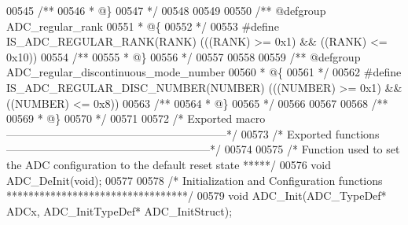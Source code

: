 \begin{DoxyCode}
00545 \textcolor{comment}{/**}
00546 \textcolor{comment}{  * @\}}
00547 \textcolor{comment}{  */}
00548 
00549 
00550 \textcolor{comment}{/** @defgroup ADC\_regular\_rank }
00551 \textcolor{comment}{  * @\{}
00552 \textcolor{comment}{  */}
00553 \textcolor{preprocessor}{#}\textcolor{preprocessor}{define} \textcolor{preprocessor}{IS\_ADC\_REGULAR\_RANK}\textcolor{preprocessor}{(}\textcolor{preprocessor}{RANK}\textcolor{preprocessor}{)} \textcolor{preprocessor}{(}\textcolor{preprocessor}{(}\textcolor{preprocessor}{(}\textcolor{preprocessor}{RANK}\textcolor{preprocessor}{)} \textcolor{preprocessor}{>=} 0x1\textcolor{preprocessor}{)} \textcolor{preprocessor}{&&} \textcolor{preprocessor}{(}\textcolor{preprocessor}{(}\textcolor{preprocessor}{RANK}\textcolor{preprocessor}{)} \textcolor{preprocessor}{<=} 0x10\textcolor{preprocessor}{)}\textcolor{preprocessor}{)}
00554 \textcolor{comment}{/**}
00555 \textcolor{comment}{  * @\}}
00556 \textcolor{comment}{  */}
00557 
00558 
00559 \textcolor{comment}{/** @defgroup ADC\_regular\_discontinuous\_mode\_number }
00560 \textcolor{comment}{  * @\{}
00561 \textcolor{comment}{  */}
00562 \textcolor{preprocessor}{#}\textcolor{preprocessor}{define} \textcolor{preprocessor}{IS\_ADC\_REGULAR\_DISC\_NUMBER}\textcolor{preprocessor}{(}\textcolor{preprocessor}{NUMBER}\textcolor{preprocessor}{)} \textcolor{preprocessor}{(}\textcolor{preprocessor}{(}\textcolor{preprocessor}{(}\textcolor{preprocessor}{NUMBER}\textcolor{preprocessor}{)} \textcolor{preprocessor}{>=} 0x1\textcolor{preprocessor}{)} \textcolor{preprocessor}{&&} \textcolor{preprocessor}{(}\textcolor{preprocessor}{(}\textcolor{preprocessor}{NUMBER}\textcolor{preprocessor}{)} \textcolor{preprocessor}{<=} 0x8\textcolor{preprocessor}{)}\textcolor{preprocessor}{)}
00563 \textcolor{comment}{/**}
00564 \textcolor{comment}{  * @\}}
00565 \textcolor{comment}{  */}
00566 
00567 
00568 \textcolor{comment}{/**}
00569 \textcolor{comment}{  * @\}}
00570 \textcolor{comment}{  */}
00571 
00572 \textcolor{comment}{/* Exported macro ------------------------------------------------------------*/}
00573 \textcolor{comment}{/* Exported functions --------------------------------------------------------*/}
00574 
00575 \textcolor{comment}{/*  Function used to set the ADC configuration to the default reset state *****/}
00576 \textcolor{keywordtype}{void} ADC_DeInit(\textcolor{keywordtype}{void});
00577 
00578 \textcolor{comment}{/* Initialization and Configuration functions *********************************/}
00579 \textcolor{keywordtype}{void} ADC_Init(ADC\_TypeDef* ADCx, ADC\_InitTypeDef* ADC\_InitStruct);

\end{DoxyCode}
